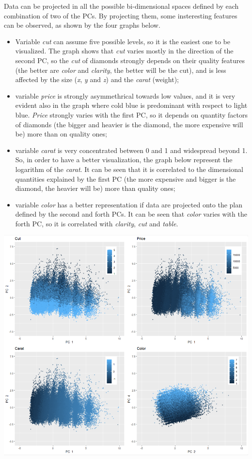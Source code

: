 \documentclass[
]{article}
\providecommand{\tightlist}{%
  \setlength{\itemsep}{0pt}\setlength{\parskip}{0pt}}
\begin{document}
Data can be projected in all the possible bi-dimensional spaces defined
by each combination of two of the PCs. By projecting them, some
insteresting features can be observed, as shown by the four graphs
below.

\begin{itemize}
\tightlist
\item
  Variable \emph{cut} can assume five possible levels, so it is the
  easiest one to be visualized. The graph shows that \emph{cut} varies
  mostly in the direction of the second PC, so the \emph{cut} of
  diamonds strongly depends on their quality features (the better are
  \emph{color} and \emph{clarity}, the better will be the cut), and is
  less affected by the size (\emph{x}, \emph{y} and \emph{z}) and the
  \emph{carat} (weight);
\item
  variable \emph{price} is strongly asymmethrical towards low values,
  and it is very evident also in the graph where cold blue is
  predominant with respect to light blue. \emph{Price} strongly varies
  with the first PC, so it depends on quantity factors of diamonds (the
  bigger and heavier is the diamond, the more expensive will be) more
  than on quality ones;
\item
  variable \emph{carat} is very concentrated between 0 and 1 and
  widespread beyond 1. So, in order to have a better visualization, the
  graph below represent the logarithm of the \emph{carat}. It can be
  seen that it is correlated to the dimensional quantities explained by
  the first PC (the more expensive and bigger is the diamond, the
  heavier will be) more than quality ones;
\item
  variable \emph{color} has a better representation if data are
  projected onto the plan defined by the second and forth PCs. It can be
  seen that \emph{color} varies with the forth PC, so it is correlated
  with \emph{clarity}, \emph{cut} and \emph{table}.
\end{itemize}

\begin{center}\includegraphics[width=0.8\linewidth]{Images/PC_Image} \end{center}
\end{document}
